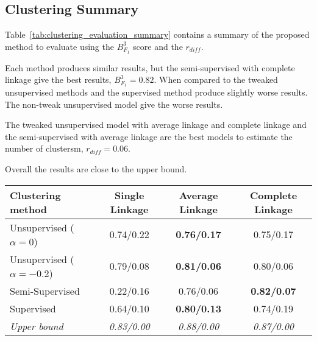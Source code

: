\subsection{Clustering Summary}

Table~\ref{tab:clustering_evaluation_summary} contains a summary of the proposed method to evaluate using the $B^3_{F_1}$ score and the $r_{diff}$.

Each method produces similar results, but the semi-supervised with complete linkage give the best results, $B^3_{F_1} = 0.82$.
When compared to the tweaked unsupervised methods and the supervised method produce slightly worse results.
The non-tweak unsupervised model give the worse results.

The tweaked unsupervised model with average linkage and complete linkage and the semi-supervised with average linkage are the best models to estimate the number of clustersm, $r_{diff} = 0.06$.

Overall the results are close to the upper bound.

\begin{table*}
  \centering
  \caption{Mean retained rank lists $B^{3}_{F_1}$/$r_{diff}$ for each corpus pair}
  \label{tab:clustering_evaluation_summary}
  \begin{tabular}{l c c c}
    \toprule
    Clustering method              & Single Linkage & Average Linkage & Complete Linkage \\
    \midrule
    Unsupervised ($\alpha = 0$)    & 0.74/0.22      & \textbf{0.76/0.17} & 0.75/0.17 \\
    Unsupervised ($\alpha = -0.2$) & 0.79/0.08      & \textbf{0.81/0.06} & 0.80/0.06 \\
    Semi-Supervised                & 0.22/0.16      & 0.76/0.06          & \textbf{0.82/0.07} \\
    Supervised                     & 0.64/0.10      & \textbf{0.80/0.13} & 0.74/0.19 \\
    \midrule
    \textit{Upper bound}           & \textit{0.83/0.00} & \textit{0.88/0.00} & \textit{0.87/0.00} \\
    \bottomrule
  \end{tabular}
\end{table*}
